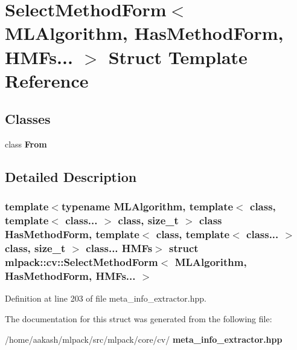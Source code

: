 \section{Select\+Method\+Form$<$ M\+L\+Algorithm, Has\+Method\+Form, H\+M\+Fs... $>$ Struct Template Reference}
\label{structmlpack_1_1cv_1_1SelectMethodForm_3_01MLAlgorithm_00_01HasMethodForm_00_01HMFs_8_8_8_01_4}
\subsection*{Classes}
\begin{DoxyCompactItemize}
\item 
class \textbf{ From}
\end{DoxyCompactItemize}


\subsection{Detailed Description}
\subsubsection*{template$<$typename M\+L\+Algorithm, template$<$ class, template$<$ class... $>$ class, size\+\_\+t $>$ class Has\+Method\+Form, template$<$ class, template$<$ class... $>$ class, size\+\_\+t $>$ class... H\+M\+Fs$>$\newline
struct mlpack\+::cv\+::\+Select\+Method\+Form$<$ M\+L\+Algorithm, Has\+Method\+Form, H\+M\+Fs... $>$}



Definition at line 203 of file meta\+\_\+info\+\_\+extractor.\+hpp.



The documentation for this struct was generated from the following file\+:\begin{DoxyCompactItemize}
\item 
/home/aakash/mlpack/src/mlpack/core/cv/\textbf{ meta\+\_\+info\+\_\+extractor.\+hpp}\end{DoxyCompactItemize}

